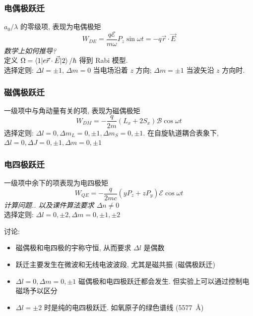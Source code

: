 \documentclass[10pt,a4paper,twocolumn]{article} %
\numberwithin{equation}{section} %
\begin{document}
\subsubsection{电偶极跃迁} %
\label{ssub:elec_dipole}
$a_0/\lambda$ 的零级项, 表现为电偶极矩 
\begin{equation}
	W_{DE} = \frac{q\mathscr E}{m\omega}P_z\sin\omega t = -q\vec r\cdot\vec E
\end{equation}
\emph{数学上如何推导? }\\
定义 $\Omega = \braket{1|e\vec r\cdot\vec E|2}/\hbar$ 得到 Rabi 模型. \\
选择定则: $\Delta l = \pm 1$, $\Delta m = 0$ 当电场沿着 $z$ 方向; 
$\Delta m = \pm 1$ 当波矢沿 $z$ 方向时.
\subsubsection{磁偶极跃迁} %
\label{ssub:mag_dipole}
一级项中与角动量有关的项, 表现为磁偶极矩
\begin{equation}
	W_{DM} = -\frac q{2m}\left(L_x + 2S_x\right)\mathscr B\cos\omega t
\end{equation}
选择定则: $\Delta l = 0, \Delta m_L = 0, \pm 1, \Delta m_S = 0, \pm 1$. 
在自旋轨道耦合表象下, $\Delta l = 0, \Delta J = 0,\pm 1, \Delta m = 0, \pm 1$
\subsubsection{电四极跃迁} %
\label{ssub:elec_quadrupole}
一级项中余下的项表现为电四极矩
\begin{equation}
	W_{QE} = -\frac q{2mc}(yP_z + zP_y)\mathscr E\cos\omega t 
\end{equation}
\emph{计算问题.. 以及课件算法要求 $\Delta n \neq 0$}\\
选择定则: $\Delta l = 0, \pm 2, \Delta m = 0,\pm 1, \pm 2$

讨论: 
\begin{itemize}
	\item 磁偶极和电四极的宇称守恒, 从而要求 $\Delta l$ 是偶数
	\item 跃迁主要发生在微波和无线电波波段, 尤其是磁共振 (磁偶极跃迁)
	\item $\Delta l = 0, \Delta m = 0, \pm 1$ 磁偶极和电四极跃迁都会发生. 
	但实验上可以通过控制电磁场予以区分
	\item $\Delta l = \pm 2$ 时是纯的电四极跃迁. 如氧原子的绿色谱线 
	(\SI{5577}{\angstrom})
\end{itemize}
\end{document}

